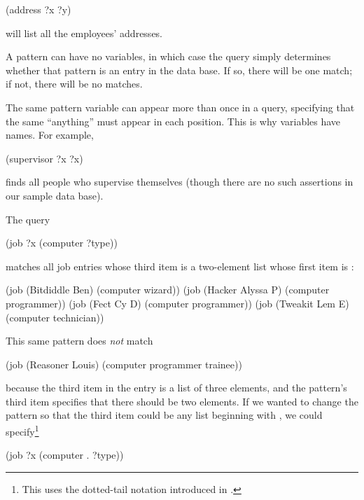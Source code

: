 \begin{codeBlock}
(address ?x ?y)
\end{codeBlock}

\noindent
will list all the employees' addresses.

A pattern can have no variables, in which case the query simply determines
whether that pattern is an entry in the data base.  If so, there will be one
match; if not, there will be no matches.

The same pattern variable can appear more than once in a query, specifying that
the same ``anything'' must appear in each position.  This is why variables have
names.  For example,

\begin{codeBlock}
(supervisor ?x ?x)
\end{codeBlock}

\noindent
finds all people who supervise themselves (though there are no such assertions
in our sample data base).

The query

\begin{codeBlock}
(job ?x (computer ?type))
\end{codeBlock}

\noindent
matches all job entries whose third item is a two-element list whose first item
is :

\begin{codeBlock}
(job (Bitdiddle Ben) (computer wizard))
(job (Hacker Alyssa P) (computer programmer))
(job (Fect Cy D) (computer programmer))
(job (Tweakit Lem E) (computer technician))
\end{codeBlock}

\noindent
This same pattern does \emph{not} match

\begin{codeBlock}
(job (Reasoner Louis) (computer programmer trainee))
\end{codeBlock}

\noindent
because the third item in the entry is a list of three elements, and the
pattern's third item specifies that there should be two elements.  If we wanted
to change the pattern so that the third item could be any list beginning with
, we could specify\footnote{This uses the dotted-tail notation
introduced in .}

\begin{codeBlock}
(job ?x (computer . ?type))
\end{codeBlock}

